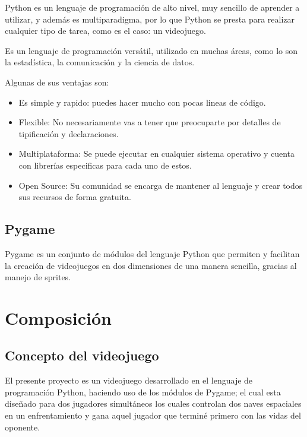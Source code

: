 \documentclass[12pt,letterpaper]{report}
\begin{document}
Python es un lenguaje de programación de alto nivel, muy sencillo de aprender a utilizar, y además es multiparadigma, por lo que Python se presta para realizar cualquier tipo de tarea, como es el caso: un videojuego.

Es un lenguaje de programación versátil, utilizado en muchas áreas, como lo son la estadística, la comunicación y la ciencia de datos. 

Algunas de sus ventajas son:

\begin{itemize}

\item Es simple y rapido: puedes hacer mucho con pocas lineas de código.

\item Flexible: No necesariamente vas a tener que preocuparte por detalles de tipificación y declaraciones.

\item Multiplataforma: Se puede ejecutar en cualquier sistema operativo y cuenta con librerías especificas para cada uno de estos.

\item Open Source: Su comunidad se encarga de mantener al lenguaje y crear todos sus recursos de forma gratuita.


\end{itemize}



\section{Pygame}

Pygame es un conjunto de módulos del lenguaje Python que permiten y facilitan la creación de videojuegos en dos dimensiones de una manera sencilla, gracias al manejo de sprites.





\chapter{Composición}

\section{Concepto del videojuego}
El presente proyecto es un videojuego desarrollado en el lenguaje de programación Python, haciendo uso de los módulos de Pygame; el cual esta diseñado para dos jugadores simultáneos los cuales controlan dos naves espaciales en un enfrentamiento y gana aquel jugador que terminé primero con las vidas del oponente.
\end{document}
